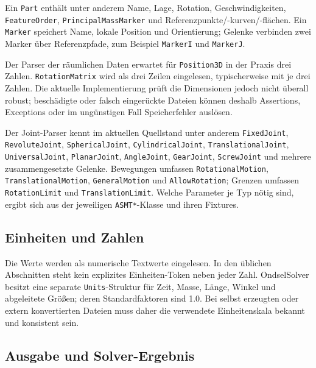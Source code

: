 \documentclass[
  12pt
]{book}
\begin{document}
Ein \texttt{Part} enthält unter anderem Name, Lage, Rotation,
Geschwindigkeiten, \texttt{FeatureOrder}, \texttt{PrincipalMassMarker}
und Referenzpunkte/-kurven/-flächen. Ein \texttt{Marker} speichert Name,
lokale Position und Orientierung; Gelenke verbinden zwei Marker über
Referenzpfade, zum Beispiel \texttt{MarkerI} und \texttt{MarkerJ}.

Der Parser der räumlichen Daten erwartet für \texttt{Position3D} in der
Praxis drei Zahlen. \texttt{RotationMatrix} wird als drei Zeilen
eingelesen, typischerweise mit je drei Zahlen. Die aktuelle
Implementierung prüft die Dimensionen jedoch nicht überall robust;
beschädigte oder falsch eingerückte Dateien können deshalb Assertions,
Exceptions oder im ungünstigen Fall Speicherfehler auslösen.

Der Joint-Parser kennt im aktuellen Quellstand unter anderem
\texttt{FixedJoint}, \texttt{RevoluteJoint}, \texttt{SphericalJoint},
\texttt{CylindricalJoint}, \texttt{TranslationalJoint},
\texttt{UniversalJoint}, \texttt{PlanarJoint}, \texttt{AngleJoint},
\texttt{GearJoint}, \texttt{ScrewJoint} und mehrere zusammengesetzte
Gelenke. Bewegungen umfassen \texttt{RotationalMotion},
\texttt{TranslationalMotion}, \texttt{GeneralMotion} und
\texttt{AllowRotation}; Grenzen umfassen \texttt{RotationLimit} und
\texttt{TranslationLimit}. Welche Parameter je Typ nötig sind, ergibt
sich aus der jeweiligen \texttt{ASMT*}-Klasse und ihren Fixtures.

\hypertarget{einheiten-und-zahlen}{%
\subsection*{Einheiten und Zahlen}\label{einheiten-und-zahlen}}

Die Werte werden als numerische Textwerte eingelesen. In den üblichen
Abschnitten steht kein explizites Einheiten-Token neben jeder Zahl.
OndselSolver besitzt eine separate \texttt{Units}-Struktur für Zeit,
Masse, Länge, Winkel und abgeleitete Größen; deren Standardfaktoren sind
1.0. Bei selbst erzeugten oder extern konvertierten Dateien muss daher
die verwendete Einheitenskala bekannt und konsistent sein.

\hypertarget{ausgabe-und-solver-ergebnis}{%
\subsection*{Ausgabe und
Solver-Ergebnis}\label{ausgabe-und-solver-ergebnis}}
\end{document}
